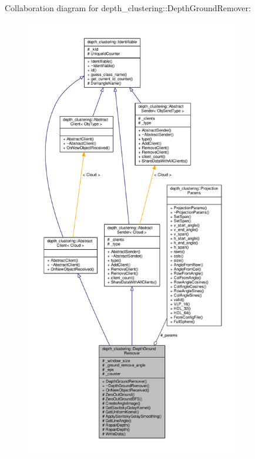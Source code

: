Collaboration diagram for depth\-\_\-clustering\-:\-:Depth\-Ground\-Remover\-:
\nopagebreak
\begin{figure}[H]
\begin{center}
\leavevmode
\includegraphics[height=550pt]{classdepth__clustering_1_1DepthGroundRemover__coll__graph}
\end{center}
\end{figure}


